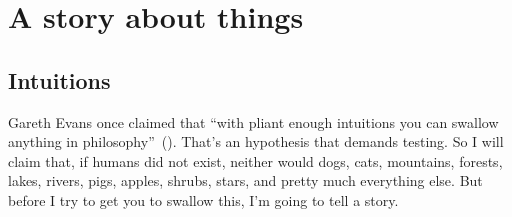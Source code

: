 %
%
%
%
%
%

\chapter{A story about things}

\section{Intuitions}
Gareth Evans once claimed that ``with pliant enough intuitions you can swallow anything in philosophy''~(\citeyear[192]{evans1973}). That's an hypothesis that demands testing. So I will claim that, if humans did not exist, neither would dogs, cats, mountains, forests, lakes, rivers, pigs, apples, shrubs, stars, and pretty much everything else. But before I try to get you to swallow this, I'm going to tell a story.

